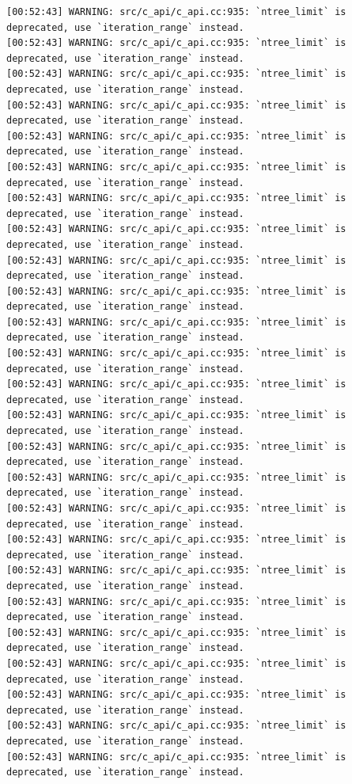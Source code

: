 \documentclass[
  letterpaper,
  DIV=11,
  numbers=noendperiod]{scrartcl}
\begin{document}
\begin{verbatim}
[00:52:43] WARNING: src/c_api/c_api.cc:935: `ntree_limit` is deprecated, use `iteration_range` instead.
[00:52:43] WARNING: src/c_api/c_api.cc:935: `ntree_limit` is deprecated, use `iteration_range` instead.
[00:52:43] WARNING: src/c_api/c_api.cc:935: `ntree_limit` is deprecated, use `iteration_range` instead.
[00:52:43] WARNING: src/c_api/c_api.cc:935: `ntree_limit` is deprecated, use `iteration_range` instead.
[00:52:43] WARNING: src/c_api/c_api.cc:935: `ntree_limit` is deprecated, use `iteration_range` instead.
[00:52:43] WARNING: src/c_api/c_api.cc:935: `ntree_limit` is deprecated, use `iteration_range` instead.
[00:52:43] WARNING: src/c_api/c_api.cc:935: `ntree_limit` is deprecated, use `iteration_range` instead.
[00:52:43] WARNING: src/c_api/c_api.cc:935: `ntree_limit` is deprecated, use `iteration_range` instead.
[00:52:43] WARNING: src/c_api/c_api.cc:935: `ntree_limit` is deprecated, use `iteration_range` instead.
[00:52:43] WARNING: src/c_api/c_api.cc:935: `ntree_limit` is deprecated, use `iteration_range` instead.
[00:52:43] WARNING: src/c_api/c_api.cc:935: `ntree_limit` is deprecated, use `iteration_range` instead.
[00:52:43] WARNING: src/c_api/c_api.cc:935: `ntree_limit` is deprecated, use `iteration_range` instead.
[00:52:43] WARNING: src/c_api/c_api.cc:935: `ntree_limit` is deprecated, use `iteration_range` instead.
[00:52:43] WARNING: src/c_api/c_api.cc:935: `ntree_limit` is deprecated, use `iteration_range` instead.
[00:52:43] WARNING: src/c_api/c_api.cc:935: `ntree_limit` is deprecated, use `iteration_range` instead.
[00:52:43] WARNING: src/c_api/c_api.cc:935: `ntree_limit` is deprecated, use `iteration_range` instead.
[00:52:43] WARNING: src/c_api/c_api.cc:935: `ntree_limit` is deprecated, use `iteration_range` instead.
[00:52:43] WARNING: src/c_api/c_api.cc:935: `ntree_limit` is deprecated, use `iteration_range` instead.
[00:52:43] WARNING: src/c_api/c_api.cc:935: `ntree_limit` is deprecated, use `iteration_range` instead.
[00:52:43] WARNING: src/c_api/c_api.cc:935: `ntree_limit` is deprecated, use `iteration_range` instead.
[00:52:43] WARNING: src/c_api/c_api.cc:935: `ntree_limit` is deprecated, use `iteration_range` instead.
[00:52:43] WARNING: src/c_api/c_api.cc:935: `ntree_limit` is deprecated, use `iteration_range` instead.
[00:52:43] WARNING: src/c_api/c_api.cc:935: `ntree_limit` is deprecated, use `iteration_range` instead.
[00:52:43] WARNING: src/c_api/c_api.cc:935: `ntree_limit` is deprecated, use `iteration_range` instead.
[00:52:43] WARNING: src/c_api/c_api.cc:935: `ntree_limit` is deprecated, use `iteration_range` instead.

\end{verbatim}
\end{document}
